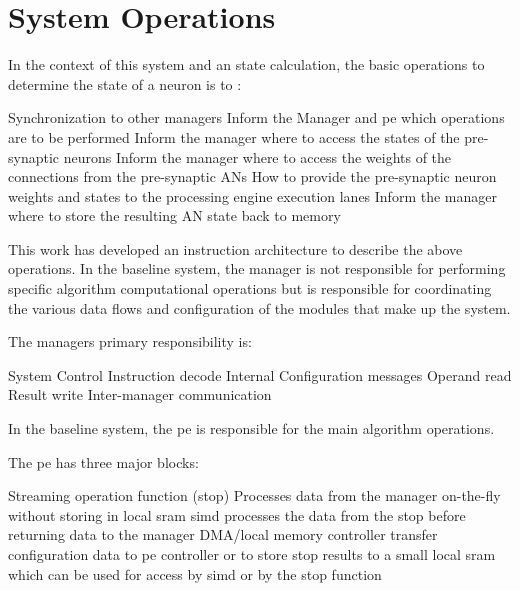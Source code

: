 

\chapter{System Operations}
\label{sec:System Operations}

In the context of this system and \ac{an} state calculation, the basic operations to determine the state of a neuron is to :
\begin{outline}
    \1 Synchronization to other managers
    \1 Inform the Manager and \ac{pe} which operations are to be performed
    \1 Inform the manager where to access the states of the pre-synaptic neurons
    \1 Inform the manager where to access the weights of the connections from the pre-synaptic ANs
    \1 How to provide the pre-synaptic neuron weights and states to the processing engine execution lanes
    \1 Inform the manager where to store the resulting AN state back to memory
\end{outline}


This work has developed an instruction architecture to describe the above operations.
In the baseline system, the manager is not responsible for performing specific algorithm computational operations but is responsible for coordinating the various data flows and configuration of the modules that make up the system.

The managers primary responsibility is:

\begin{outline}
    \1 System Control
    \1 Instruction decode
    \1 Internal Configuration messages
    \1 Operand read
    \1 Result write
    \1 Inter-manager communication
\end{outline}

In the baseline system, the \ac{pe} is responsible for the main algorithm operations.

The \ac{pe} has three major blocks:

\begin{outline}
    \1 Streaming operation function (\ac{stop})
      \2 Processes data from the manager on-the-fly without storing in local \ac{sram}
    \1 \ac{simd}
      \2 processes the data from the \ac{stop} before returning data to the manager
    \1 DMA/local memory controller
      \2 transfer configuration data to \ac{pe} controller or to store \ac{stop} results to a small local \ac{sram} which can be used for access by \ac{simd} or by the \ac{stop} function
\end{outline}
